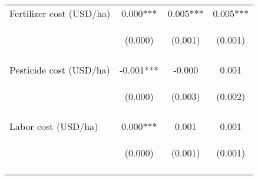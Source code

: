 \begin{center}
\begin{tabular}{lccc}
Fertilizer cost (USD/ha) & 0.000*** & 0.005*** & 0.005*** \\
 & \begin{footnotesize}(0.000)\end{footnotesize} & \begin{footnotesize}(0.001)\end{footnotesize} & \begin{footnotesize}(0.001)\end{footnotesize} \\
\vspace{4pt} & \begin{footnotesize}[0.000]\end{footnotesize} & \begin{footnotesize}[0.000]\end{footnotesize} & \begin{footnotesize}[0.000]\end{footnotesize} \\
Pesticide cost (USD/ha) & -0.001*** & -0.000 & 0.001 \\
 & \begin{footnotesize}(0.000)\end{footnotesize} & \begin{footnotesize}(0.003)\end{footnotesize} & \begin{footnotesize}(0.002)\end{footnotesize} \\
\vspace{4pt} & \begin{footnotesize}[0.010]\end{footnotesize} & \begin{footnotesize}[0.997]\end{footnotesize} & \begin{footnotesize}[0.787]\end{footnotesize} \\
Labor cost (USD/ha) & 0.000*** & 0.001 & 0.001 \\
 & \begin{footnotesize}(0.000)\end{footnotesize} & \begin{footnotesize}(0.001)\end{footnotesize} & \begin{footnotesize}(0.001)\end{footnotesize} \\
\vspace{4pt} & \begin{footnotesize}[0.008]\end{footnotesize} & \begin{footnotesize}[0.169]\end{footnotesize} & \begin{footnotesize}[0.197]\end{footnotesize} \\

\end{tabular}
\end{center}
